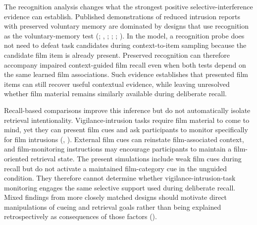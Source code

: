 \documentclass[
  man,
  floatsintext,
  longtable,
  nolmodern,
  notxfonts,
  notimes,
  draftfirst,
  colorlinks=true,linkcolor=blue,citecolor=blue,urlcolor=blue]{apa7}
\begin{document}
The recognition analysis changes what the strongest positive
selective-interference evidence can establish. Published demonstrations
of reduced intrusion reports with preserved voluntary memory are
dominated by designs that use recognition as the voluntary-memory test
(;
,
;
;
;
). In the model,
a recognition probe does not need to defeat task candidates during
context-to-item sampling because the candidate film item is already
present. Preserved recognition can therefore accompany impaired
context-guided film recall even when both tests depend on the same
learned film associations. Such evidence establishes that presented film
items can still recover useful contextual evidence, while leaving
unresolved whether film material remains similarly available during
deliberate recall.

Recall-based comparisons improve this inference but do not automatically
isolate retrieval intentionality. Vigilance-intrusion tasks require film
material to come to mind, yet they can present film cues and ask
participants to monitor specifically for film intrusions
(,
). External film cues can
reinstate film-associated context, and film-monitoring instructions may
encourage participants to maintain a film-oriented retrieval state. The
present simulations include weak film cues during recall but do not
activate a maintained film-category cue in the unguided condition. They
therefore cannot determine whether vigilance-intrusion-task monitoring
engages the same selective support used during deliberate recall. Mixed
findings from more closely matched designs should motivate direct
manipulations of cueing and retrieval goals rather than being explained
retrospectively as consequences of those factors
().
\end{document}
